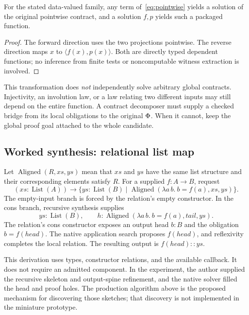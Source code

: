 \begin{proposition}
For the stated data-valued family, any term of~\eqref{eq:pointwise} yields a solution of the original pointwise contract, and a solution $f,p$ yields such a packaged function.
\end{proposition}
\begin{proof}
The forward direction uses the two projections pointwise. The reverse direction maps $x$ to $\langle f(x),p(x)\rangle$. Both are directly typed dependent functions; no inference from finite tests or noncomputable witness extraction is involved.
\end{proof}

This transformation does \emph{not} independently solve arbitrary global contracts. Injectivity, an involution law, or a law relating two different inputs may still depend on the entire function. A contract decomposer must supply a checked bridge from its local obligations to the original $\Phi$. When it cannot, keep the global proof goal attached to the whole candidate.

\subsection{Worked synthesis: relational list map}

Let $\operatorname{Aligned}(R,xs,ys)$ mean that $xs$ and $ys$ have the same list structure and their corresponding elements satisfy $R$. For a supplied $f:A\to B$, request
\[
 (xs:\operatorname{List}(A))\to
 \{ys:\operatorname{List}(B)\mid
      \operatorname{Aligned}(\lambda a\,b.\ b=f(a),xs,ys)\}.
\]
The empty-input branch is forced by the relation's empty constructor. In the cons branch, recursive synthesis supplies
\[
 ys:\operatorname{List}(B),\qquad
 h:\operatorname{Aligned}(\lambda a\,b.\ b=f(a),tail,ys).
\]
The relation's cons constructor exposes an output head $b:B$ and the obligation $b=f(head)$. The native application search proposes $f(head)$, and reflexivity completes the local relation. The resulting output is $f(head)::ys$.

This derivation uses types, constructor relations, and the available callback. It does not require an admitted  component. In the experiment, the author supplied the recursive skeleton and output-spine refinement, and the native solver filled the head and proof holes. The production algorithm above is the proposed mechanism for discovering those sketches; that discovery is not implemented in the miniature prototype.

